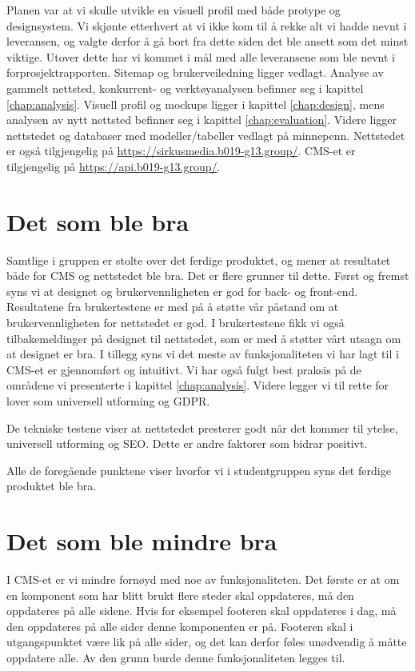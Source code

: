 Planen var at vi skulle utvikle en visuell profil med både protype og designsystem. Vi skjønte etterhvert at vi ikke kom til å rekke alt vi hadde nevnt i leveransen, og valgte derfor å gå bort fra dette siden det ble ansett som det minst viktige. Utover dette har vi kommet i mål med alle leveransene som ble nevnt i forprosjektrapporten. Sitemap og brukerveiledning ligger vedlagt. Analyse av gammelt nettsted, konkurrent- og verktøyanalysen befinner seg i kapittel \ref{chap:analysis}. Visuell profil og mockups ligger i kapittel \ref{chap:design}, mens analysen av nytt nettsted befinner seg i kapittel \ref{chap:evaluation}. Videre ligger nettstedet og databaser med modeller/tabeller vedlagt på minnepenn. Nettstedet er også tilgjengelig på \url{https://sirkusmedia.b019-g13.group/}. CMS-et er tilgjengelig på \url{https://api.b019-g13.group/}.

\section{Det som ble bra}
Samtlige i gruppen er stolte over det ferdige produktet, og mener at resultatet både for CMS og nettstedet ble bra. Det er flere grunner til dette. Først og fremst syns vi at designet og brukervennligheten er god for back- og front-end. Resultatene fra brukertestene er med på å støtte vår påstand om at brukervennligheten for nettstedet er god. I brukertestene fikk vi også tilbakemeldinger på designet til nettstedet, som er med å støtter vårt utsagn om at designet er bra. I tillegg syns vi det meste av funksjonaliteten vi har lagt til i CMS-et er gjennomført og intuitivt. Vi har også fulgt best praksis på de områdene vi presenterte i kapittel \ref{chap:analysis}. Videre legger vi til rette for lover som universell utforming og GDPR. 

De tekniske testene viser at nettstedet presterer godt når det kommer til ytelse, universell utforming og SEO. Dette er andre faktorer som bidrar positivt.

Alle de foregående punktene viser hvorfor vi i studentgruppen syns det ferdige produktet ble bra.

\section{Det som ble mindre bra}
I CMS-et er vi mindre fornøyd med noe av funksjonaliteten. Det første er at om en komponent som har blitt brukt flere steder skal oppdateres, må den oppdateres på alle sidene. Hvis for eksempel footeren skal oppdateres i dag, må den oppdateres på alle sider denne komponenten er på. Footeren skal i utgangspunktet være lik på alle sider, og det kan derfor føles unødvendig å måtte oppdatere alle. Av den grunn burde denne funksjonaliteten legges til.


